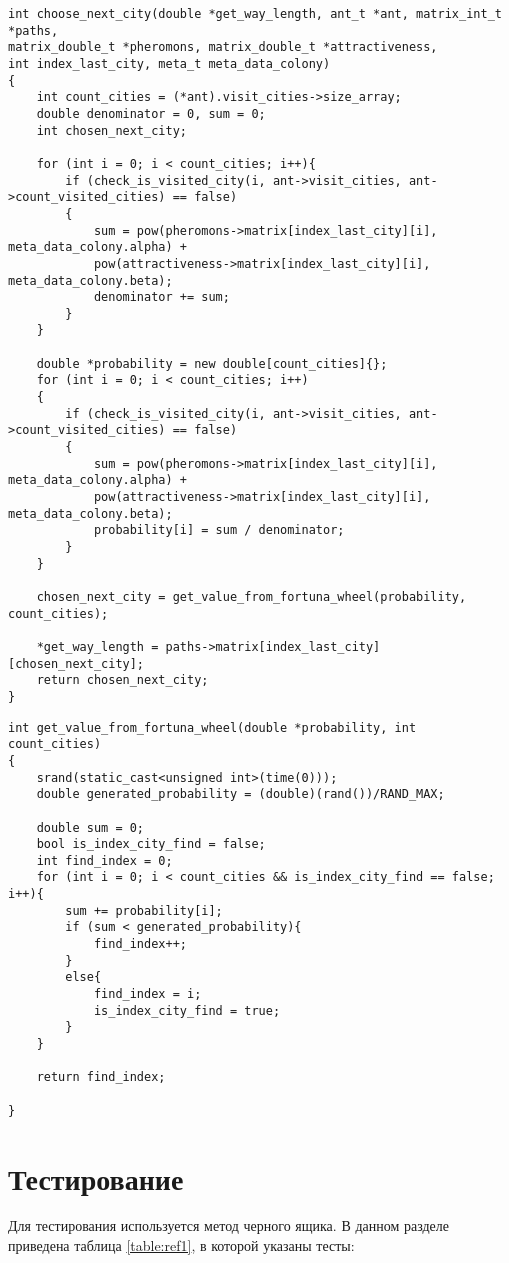 \begin{lstlisting}[label=next_city, caption=Программный код выбора муравьем следующего города.]
int choose_next_city(double *get_way_length, ant_t *ant, matrix_int_t *paths,
matrix_double_t *pheromons, matrix_double_t *attractiveness,
int index_last_city, meta_t meta_data_colony)
{
	int count_cities = (*ant).visit_cities->size_array;
	double denominator = 0, sum = 0;
	int chosen_next_city;

	for (int i = 0; i < count_cities; i++){
		if (check_is_visited_city(i, ant->visit_cities, ant->count_visited_cities) == false)
		{
			sum = pow(pheromons->matrix[index_last_city][i], meta_data_colony.alpha) +
			pow(attractiveness->matrix[index_last_city][i], meta_data_colony.beta);
			denominator += sum;
		}
	}
	
	double *probability = new double[count_cities]{};
	for (int i = 0; i < count_cities; i++)
	{
		if (check_is_visited_city(i, ant->visit_cities, ant->count_visited_cities) == false)
		{
			sum = pow(pheromons->matrix[index_last_city][i], meta_data_colony.alpha) +
			pow(attractiveness->matrix[index_last_city][i], meta_data_colony.beta);
			probability[i] = sum / denominator;
		}
	}
	
	chosen_next_city = get_value_from_fortuna_wheel(probability, count_cities);
	
	*get_way_length = paths->matrix[index_last_city][chosen_next_city];
	return chosen_next_city;
}
\end{lstlisting}

\begin{lstlisting}[label=fortuna_wheel, caption=Программный код выбора города случайным образом ("колесо фортуны").]
int get_value_from_fortuna_wheel(double *probability, int count_cities)
{
	srand(static_cast<unsigned int>(time(0)));
	double generated_probability = (double)(rand())/RAND_MAX;
	
	double sum = 0;
	bool is_index_city_find = false;
	int find_index = 0;
	for (int i = 0; i < count_cities && is_index_city_find == false; i++){
		sum += probability[i];
		if (sum < generated_probability){
			find_index++;
		}
		else{
			find_index = i;
			is_index_city_find = true;
		}
	}
	
	return find_index; 
	
}
\end{lstlisting}

\section{Тестирование}
Для тестирования используется метод черного ящика. В данном разделе приведена таблица \ref{table:ref1}, в которой указаны тесты:

